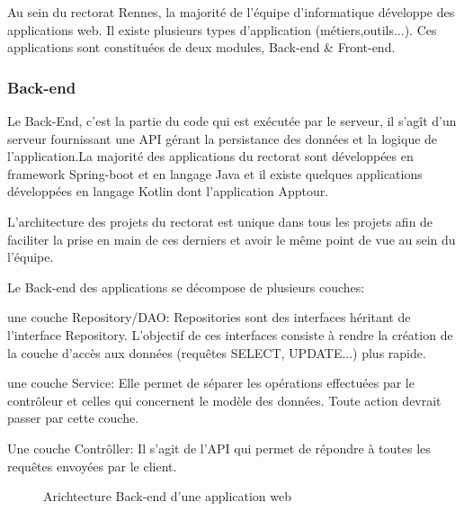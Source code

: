 \documentclass[a4paper]{article}
\begin{document}
Au sein du rectorat Rennes, la majorité de l'équipe d'informatique  développe des applications web. Il existe plusieurs types d'application (métiers,outils...). Ces applications sont constituées de deux modules, Back-end \&  Front-end.

\subsubsection{Back-end}

Le Back-End, c’est la partie du code qui est exécutée par le serveur, il s’agît d'un serveur fournissant une API gérant la persistance des données et la logique de l'application.La majorité des applications du rectorat sont développées en framework Spring-boot et en langage Java et il existe quelques applications développées en langage Kotlin dont l'application Apptour.

L'architecture des projets du rectorat est unique dans tous les projets afin  de faciliter la prise en main de ces derniers et avoir le même point de vue au sein du l'équipe.

Le Back-end des applications se décompose de plusieurs couches: 

une couche Repository/DAO: Repositories sont des interfaces héritant de l'interface Repository. L'objectif de ces interfaces consiste à rendre la création de la couche d'accès aux données (requêtes SELECT, UPDATE...) plus rapide.

une couche Service: Elle permet de séparer les opérations effectuées par le contrôleur et celles qui concernent le modèle des données. Toute action devrait passer par cette couche.

Une couche Contrôller: Il s'agit de l'API qui permet de répondre à toutes les requêtes envoyées par le client. 

\begin{figure}[H]
	\centering
  		\caption{Arichtecture Back-end d'une application web}
	\end{figure}
\end{document}
